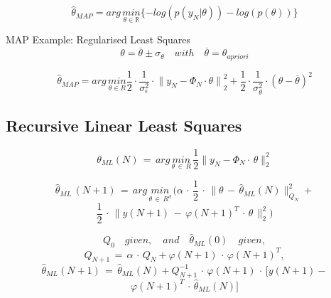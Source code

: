 \begin{equation*}
{ \hat{\theta} }_{ MAP } = arg \, \underset { \theta \in \mathbb{R} }{ min } \{-log(p({ y }_{ N }|\theta))-log(p(\theta))\}
\end{equation*}

MAP Example: Regularised Least Squares
\begin{equation*}
\theta =\overline { \theta  } \pm { \sigma  }_{ \theta  }\quad with \quad \overline { \theta  } = { \theta  }_{ apriori  }
\end{equation*}

\begin{equation*}
{ \hat { \theta  }  }_{ MAP }=arg\, \underset { \theta \in { R } }{ min } \frac { 1 }{ 2 } \cdot \frac { 1 }{ { \sigma  }_{ \epsilon  }^{ 2 } } \cdot { \parallel { y }_{ N }-{ \Phi  }_{ N }\cdot \theta \parallel  }_{ 2 }^{ 2 }+\frac { 1 }{ 2 } \cdot \frac { 1 }{ { \sigma  }_{ \theta  }^{ 2 } } \cdot { (\theta -  \overline{\theta}) }^{ 2 }
\end{equation*}

\subsection*{Recursive Linear Least Squares}
\begin{equation*}
\theta _{ ML }(N) \, = \, arg\, \underset { \theta \, \in \, { R } }{ min } \, \frac { 1 }{ 2 } \parallel y_N - \Phi_N\cdot\,\theta{ \parallel  }_{ 2 }^{ 2 }
\end{equation*}

\begin{equation*}
\hat { \theta  } _{ ML }\, (N+1)\, =\, arg\, \underset { \theta \, \in \, { R^{ d } } }{ min } \, (\alpha \, \cdot \, \frac { 1 }{ 2 } \, \cdot \, \parallel \theta \, - \, \hat { \theta  } _{ ML }(N){ \parallel  }_{ Q_{ N } }^{ 2 }+
\end{equation*}
\begin{equation*}
\frac { 1 }{ 2 } \, \cdot \, \parallel y(N+1) \, - \, \varphi (N+1)^{ T }\, \cdot \, \theta \, { \parallel  }_{ 2 }^{ 2 })
\end{equation*}

\begin{equation*}
Q_{ 0 }\quad given,\quad and\quad \hat { \theta  } _{ ML }(0)\quad given,
\end{equation*}
\begin{equation*}
Q_{ N+1 }\, =\, \alpha \, \cdot \, Q_{ N }+\varphi (N+1)\, \cdot \, \varphi (N+1)^{ T },
\end{equation*}
\begin{equation*}
\hat { \theta  } _{ ML }(N+1)\, =\, \hat { \theta  } _{ ML }(N)+Q_{ N+1 }^{ -1 }\, \cdot \, \varphi (N+1)\, \cdot \, [y(N+1)-
\end{equation*}
\begin{equation*}
\varphi(N+1)^T \, \cdot \,\hat{\theta}_{ML}(N)]
\end{equation*}

